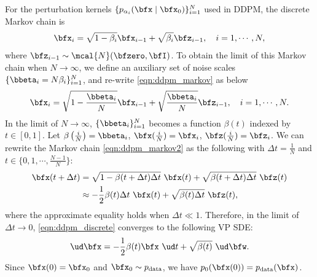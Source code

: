 For the perturbation kernels $\{p_{\alpha_i}(\bfx \mid \bfx_0)\}_{i=1}^N$ used in DDPM, the discrete Markov chain is
\begin{align}
    \bfx_i = \sqrt{1-\beta_{i}} \bfx_{i-1} + \sqrt{\beta_{i}} \bfz_{i-1}, \quad i=1,\cdots,N, \label{eqn:ddpm_markov}
\end{align}
where $\bfz_{i-1} \sim \mcal{N}(\bfzero, \bfI)$. To obtain the limit of this Markov chain when $N\to\infty$, we define an auxiliary set of noise scales $\{\bbeta_i = N \beta_i\}_{i=1}^N$, and re-write \cref{eqn:ddpm_markov} as below
\begin{align}
    \bfx_i = \sqrt{1-\frac{\bbeta_{i}}{N}} \bfx_{i-1} + \sqrt{\frac{\bbeta_{i}}{N}} \bfz_{i-1}, \quad i=1,\cdots,N. \label{eqn:ddpm_markov2}
\end{align}
In the limit of $N\to \infty$, $\{\bbeta_i\}_{i=1}^N$ becomes a function $\beta(t)$ indexed by $t \in [0, 1]$. Let $\beta\left(\frac{i}{N}\right) = \bbeta_i$, $\bfx(\frac{i}{N}) = \bfx_i$, $\bfz(\frac{i}{N}) = \bfz_i$. We can rewrite the Markov chain \cref{eqn:ddpm_markov2} as the following with $\Delta t = \frac{1}{N}$ and $t \in \{0, 1, \cdots, \frac{N-1}{N}\}$:
\begin{align}
\bfx(t + \Delta t) &= \sqrt{1 - \beta(t + \Delta t)\Delta t} ~\bfx(t) + \sqrt{\beta(t + \Delta t)\Delta t}~ \bfz(t) \notag\\
&\approx -\frac{1}{2}\beta(t)\Delta t~\bfx(t) + \sqrt{\beta(t)\Delta t}~ \bfz(t), \label{eqn:ddpm_discrete}
\end{align}
where the approximate equality holds when $\Delta t \ll 1$.
Therefore, in the limit of $\Delta t \to 0$, \cref{eqn:ddpm_discrete} converges to the following VP SDE:
\begin{align}
\ud \bfx = -\frac{1}{2}\beta(t) \bfx~ \ud t + \sqrt{\beta(t)} ~\ud \bfw.
\end{align}
Since $\bfx(0) = \bfx_0$ and $\bfx_0 \sim p_\text{data}$, we have $p_0(\bfx(0)) = p_\text{data}(\bfx)$.


